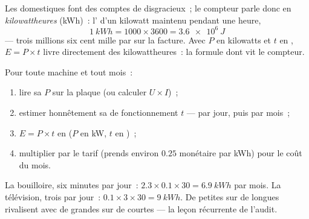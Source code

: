 \begin{definition}[Le kilowattheure]\label{def:g9:electric-power-energy:kwh}
Les  domestiques font des comptes de  disgracieux~; le
compteur parle donc en
\emph{kilowattheures} (\unit{kWh})~: l'
d'un kilowatt maintenu pendant une heure,
\[
\qty{1}{kWh} = 1000 \times 3600 = \qty{3.6e6}{J}
\]
--- trois millions six cent mille  par  sur la facture.
Avec $P$ en kilowatts et $t$ en , $E = P \times t$ livre
directement des kilowattheures~: la formule dont vit le compteur.
\end{definition}

\begin{method}\label{met:g9:electric-power-energy:audit}
Pour toute machine et tout mois~:
\begin{enumerate}
  \item lire sa  $P$ sur la plaque (ou calculer
        $U \times I$)~;
  \item estimer honnêtement sa  de fonctionnement $t$ --- par
        jour, puis par mois~;
  \item $E = P \times t$ en  ($P$ en \unit{kW}, $t$
        en )~;
  \item multiplier par le tarif (prends environ $0.25$ 
        monétaire par \unit{kWh}) pour le coût du mois.
\end{enumerate}
La bouilloire, six minutes par jour~:
$2.3 \times 0.1 \times 30 = \qty{6.9}{kWh}$ par mois. La télévision,
trois  par jour~: $0.1 \times 3 \times 30 = \qty{9}{kWh}$. De
petites  sur de longues  rivalisent avec de grandes
 sur de courtes --- la leçon récurrente de l'audit.
\end{method}

